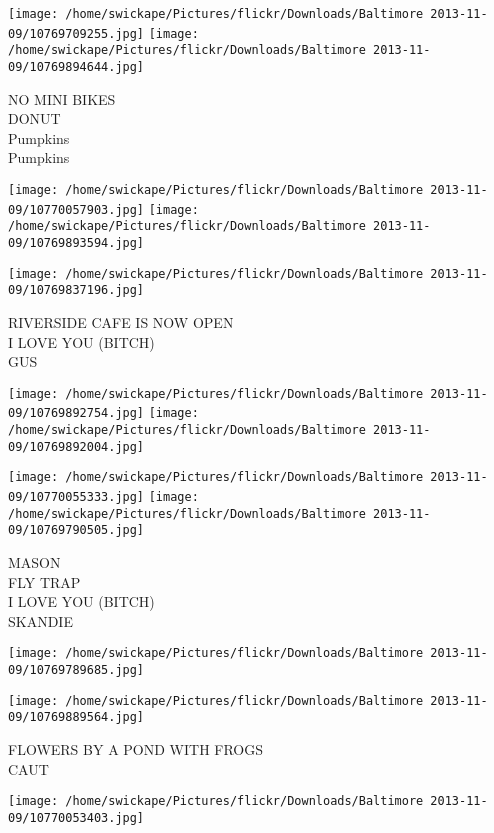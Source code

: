\documentclass[10pt,letterpaper]{article}
\begin{document}
\texttt{[image: /home/swickape/Pictures/flickr/Downloads/Baltimore 2013-11-09/10769709255.jpg]}
\texttt{[image: /home/swickape/Pictures/flickr/Downloads/Baltimore 2013-11-09/10769894644.jpg]}

NO MINI BIKES\\
DONUT\\
Pumpkins\\
Pumpkins\\
\pagebreak

\texttt{[image: /home/swickape/Pictures/flickr/Downloads/Baltimore 2013-11-09/10770057903.jpg]}
\texttt{[image: /home/swickape/Pictures/flickr/Downloads/Baltimore 2013-11-09/10769893594.jpg]}

\vspace{0.25in}
\texttt{[image: /home/swickape/Pictures/flickr/Downloads/Baltimore 2013-11-09/10769837196.jpg]}

RIVERSIDE CAFE IS NOW OPEN\\
I LOVE YOU (BITCH)\\
GUS\\
\pagebreak

\texttt{[image: /home/swickape/Pictures/flickr/Downloads/Baltimore 2013-11-09/10769892754.jpg]}
\texttt{[image: /home/swickape/Pictures/flickr/Downloads/Baltimore 2013-11-09/10769892004.jpg]}

\texttt{[image: /home/swickape/Pictures/flickr/Downloads/Baltimore 2013-11-09/10770055333.jpg]}
\texttt{[image: /home/swickape/Pictures/flickr/Downloads/Baltimore 2013-11-09/10769790505.jpg]}

MASON\\
FLY TRAP\\
I LOVE YOU (BITCH)\\
SKANDIE\\
\pagebreak

\texttt{[image: /home/swickape/Pictures/flickr/Downloads/Baltimore 2013-11-09/10769789685.jpg]}

\vspace{0.25in}
\texttt{[image: /home/swickape/Pictures/flickr/Downloads/Baltimore 2013-11-09/10769889564.jpg]}

FLOWERS BY A POND WITH FROGS\\
CAUT\\
\pagebreak

\texttt{[image: /home/swickape/Pictures/flickr/Downloads/Baltimore 2013-11-09/10770053403.jpg]}
\end{document}
